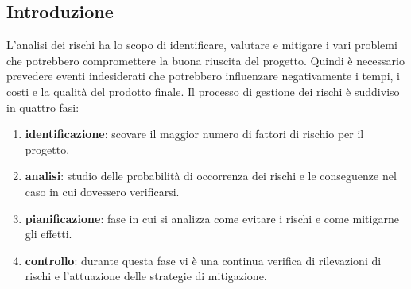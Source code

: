 \subsection{Introduzione}
L'analisi dei rischi ha lo scopo di identificare, valutare e mitigare i vari problemi che potrebbero compromettere la buona riuscita del progetto. 
Quindi è necessario prevedere eventi indesiderati che potrebbero influenzare negativamente i tempi, i costi e la qualità del prodotto finale.
Il processo di gestione dei rischi è suddiviso in quattro fasi:
\begin{enumerate}
    \item \textbf{identificazione}: scovare il maggior numero di fattori di rischio per il progetto.
    \item \textbf{analisi}: studio delle probabilità di occorrenza dei rischi e le conseguenze nel caso in cui dovessero verificarsi.
    \item \textbf{pianificazione}: fase in cui si analizza come evitare i rischi e come mitigarne gli effetti.
    \item \textbf{controllo}: durante questa fase vi è una continua verifica di rilevazioni di rischi e l'attuazione delle strategie di mitigazione. 
\end{enumerate}